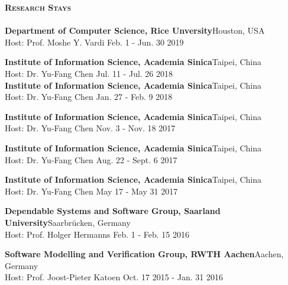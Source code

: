 \documentclass[a4paper]{article}
\newcommand{\lineunder} {
    \vspace*{-8pt} \\
    \hspace*{-18pt} \hrulefill \\
}
\newcommand{\header} [1] {
    {\hspace*{-18pt}\vspace*{6pt} \textsc{#1}}
    \vspace*{-6pt} \lineunder
}
\begin{document}
\begin{CJK*}{UTF8}{gkai}

\header{\textbf{Research Stays}}
\textbf{Department of Computer Science, Rice Unversity}\hfill Houston, USA\\
Host: Prof. Moshe Y. Vardi \hfill Feb. 1 - Jun. 30 2019 \\
\vspace{2mm}

\textbf{Institute of Information Science, Academia Sinica}\hfill Taipei, China\\
Host: Dr. Yu-Fang Chen \hfill Jul. 11 - Jul. 26 2018 \\
\vspace{2mm}
\textbf{Institute of Information Science, Academia Sinica}\hfill Taipei, China\\
Host: Dr. Yu-Fang Chen \hfill Jan. 27 -  Feb. 9 2018 \\

\vspace{2mm}

\textbf{Institute of Information Science, Academia Sinica}\hfill Taipei, China\\
Host: Dr. Yu-Fang Chen \hfill Nov. 3 -  Nov. 18 2017 \\

\vspace{2mm}

\textbf{Institute of Information Science, Academia Sinica}\hfill Taipei, China\\
Host: Dr. Yu-Fang Chen \hfill Aug. 22 - Sept. 6 2017 \\

\vspace{2mm}

\textbf{Institute of Information Science, Academia Sinica}\hfill Taipei, China\\
Host: Dr. Yu-Fang Chen \hfill May 17 - May 31 2017 \\

\vspace{2mm}

\textbf{Dependable Systems and Software Group, Saarland University}\hfill Saarbr\"ucken, Germany\\
Host: Prof. Holger Hermanns \hfill Feb. 1 - Feb. 15 2016 \\

\vspace{2mm}

\textbf{Software Modelling and Verification Group, RWTH Aachen}\hfill Aachen, Germany\\
Host: Prof. Joost-Pieter Katoen \hfill Oct. 17 2015 - Jan. 31 2016 \\


\end{CJK*}
\end{document}

